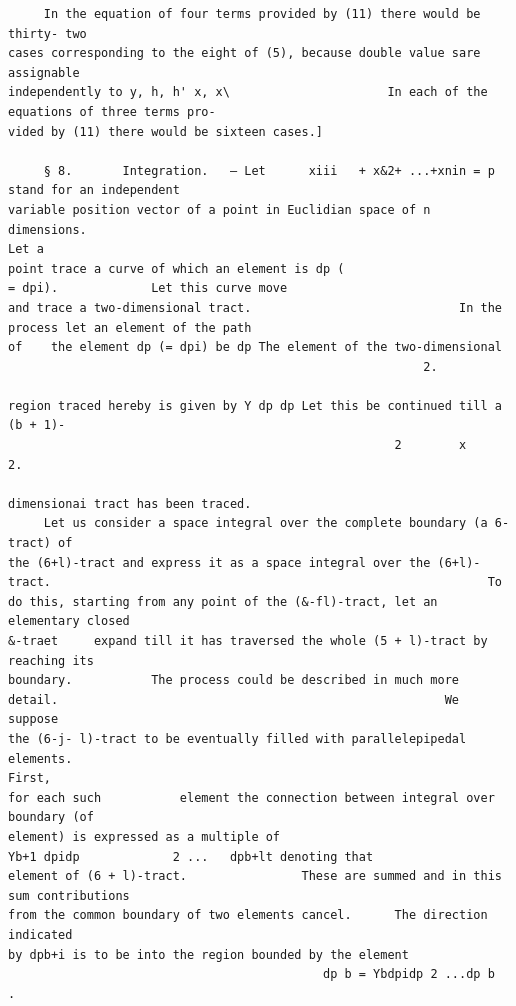 \documentclass[10pt]{article}
\begin{document}
\begin{verbatim}
     In the equation of four terms provided by (11) there would be thirty- two
cases corresponding to the eight of (5), because double value sare assignable
independently to y, h, h' x, x\                      In each of the equations of three terms pro-
vided by (11) there would be sixteen cases.]

     § 8.       Integration.   — Let      xiii   + x&2+ ...+xnin = p stand for an independent
variable position vector of a point in Euclidian space of n dimensions.                                                           Let a
point trace a curve of which an element is dp (                                          = dpi).             Let this curve move
and trace a two-dimensional tract.                             In the process let an element of the path
of    the element dp (= dpi) be dp The element of the two-dimensional
                                                          2.

region traced hereby is given by Y dp dp Let this be continued till a (b + 1)-
                                                      2        x         2.

dimensionai tract has been traced.
     Let us consider a space integral over the complete boundary (a 6-tract) of
the (6+l)-tract and express it as a space integral over the (6+l)-tract.                                                             To
do this, starting from any point of the (&-fl)-tract, let an elementary closed
&-traet     expand till it has traversed the whole (5 + l)-tract by reaching its
boundary.           The process could be described in much more detail.                                                      We suppose
the (6-j- l)-tract to be eventually filled with parallelepipedal elements.                                                        First,
for each such           element the connection between integral over boundary (of
element) is expressed as a multiple of                                        Yb+1 dpidp             2 ...   dpb+lt denoting that
element of (6 + l)-tract.                These are summed and in this sum contributions
from the common boundary of two elements cancel.      The direction indicated
by dpb+i is to be into the region bounded by the element
                                            dp b = Ybdpidp 2 ...dp b                           .


\end{verbatim}
\clearpage
\end{document}

